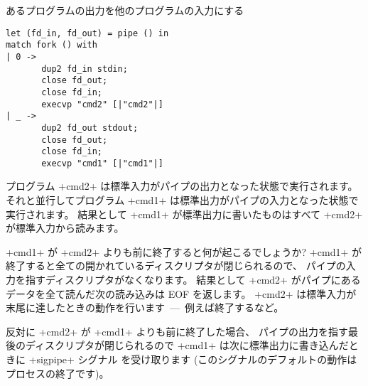 \begin{example} %
あるプログラムの出力を他のプログラムの入力にする
%
\begin{lstlisting}
let (fd_in, fd_out) = pipe () in
match fork () with
| 0 ->
       dup2 fd_in stdin;
       close fd_out;
       close fd_in;
       execvp "cmd2" [|"cmd2"|]
| _ ->
       dup2 fd_out stdout;
       close fd_out;
       close fd_in;
       execvp "cmd1" [|"cmd1"|]
\end{lstlisting}
%
プログラム \ml+cmd2+ は標準入力がパイプの出力となった状態で実行されます。
それと並行してプログラム \ml+cmd1+ は標準出力がパイプの入力となった状態で実行されます。
結果として \ml+cmd1+ が標準出力に書いたものはすべて \ml+cmd2+ が標準入力から読みます。

\ml+cmd1+ が \ml+cmd2+ よりも前に終了すると何が起こるでしょうか?
\ml+cmd1+ が終了すると全ての開かれているディスクリプタが閉じられるので、
パイプの入力を指すディスクリプタがなくなります。
結果として \ml+cmd2+ がパイプにあるデータを全て読んだ次の読み込みは EOF を返します。
\ml+cmd2+ は標準入力が末尾に達したときの動作を行います~---~例えば終了するなど。


反対に \ml+cmd2+ が \ml+cmd1+ よりも前に終了した場合、
パイプの出力を指す最後のディスクリプタが閉じられるので \ml+cmd1+ は次に標準出力に書き込んだときに \ml+sigpipe+ シグナル
を受け取ります (このシグナルのデフォルトの動作はプロセスの終了です)。


\end{example}

